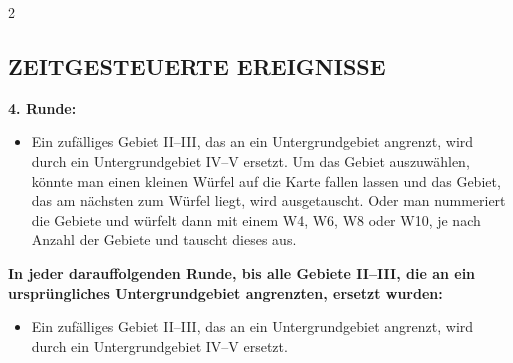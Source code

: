 \begin{multicols*}{2}
\subsection*{\MakeUppercase{Zeitgesteuerte Ereignisse}} 
\textbf{4. Runde:} 
\begin{itemize} \item Ein zufälliges Gebiet II--III, das an ein Untergrundgebiet angrenzt, wird durch ein Untergrundgebiet IV--V ersetzt. Um das Gebiet auszuwählen, könnte man einen kleinen Würfel auf die Karte fallen lassen und das Gebiet, das am nächsten zum Würfel liegt, wird ausgetauscht. Oder man nummeriert die Gebiete und würfelt dann mit einem W4, W6, W8 oder W10, je nach Anzahl der Gebiete und tauscht dieses aus.
\end{itemize} 
\textbf{In jeder darauffolgenden Runde, bis alle Gebiete II--III, die an ein ursprüngliches Untergrundgebiet angrenzten, ersetzt wurden:} 
\begin{itemize} 
\item Ein zufälliges Gebiet II--III, das an ein Untergrundgebiet angrenzt, wird durch ein Untergrundgebiet IV--V ersetzt. 
\end{itemize} 

\end{multicols*}

